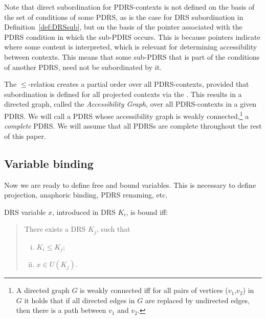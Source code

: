 \noindent Note that direct subordination for PDRS-contexts is not defined on
the basis of the set of conditions of some PDRS, as is the case for DRS
subordination in Definition~\ref{def:DRSsub}, but on the basis of the
pointer associated with the PDRS condition in which the sub-PDRS occurs.
This is because pointers indicate where some content is interpreted, which
is relevant for determining accessibility between contexts. This means that
some sub-PDRS that is part of the conditions of another PDRS, need not be
subordinated by it. 

The $\leq$-relation creates a partial order over all PDRS-contexts, provided
that subordination is defined for all projected contexts via the \MAPs. This
results in a directed graph, called the \textit{Accessibility Graph}, over
all PDRS-contexts in a given PDRS. We will call a PDRS whose accessibility
graph is weakly connected,\footnote{A directed graph $G$ is weakly connected
  iff for all pairs of vertices ($v_1$,$v_2$) in $G$ it holds that if all
  directed edges in $G$ are replaced by undirected edges, then there is
a path between $v_1$ and $v_2$.} a \emph{complete} PDRS. We will assume that
all PDRSs are complete throughout the rest of this paper.


\subsection{Variable binding}

Now we are ready to define free and bound variables.  This is necessary to
define projection, anaphoric binding, PDRS renaming, etc.

\begin{definition}
DRS variable $x$, introduced in DRS $K_i$, is bound iff:
\begin{quote}
There exists a DRS $K_j$, such that
\begin{enumerate}[i.]
  \item $K_i \leq K_j$;
  \item $x\in U(K_j)$. %
\end{enumerate}
\end{quote}
\end{definition}

